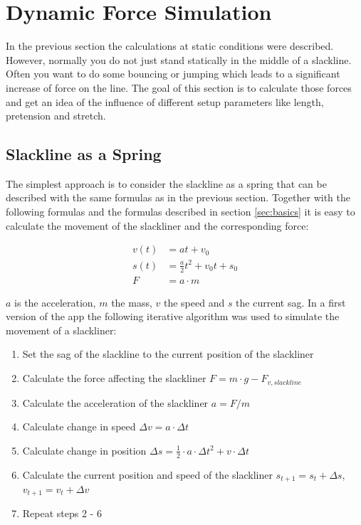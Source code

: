 \chapter{Dynamic Force Simulation}

In the previous section the calculations at static conditions were described. However, normally you do not just stand statically in the middle of a slackline. Often you want to do some bouncing or jumping which leads to a significant increase of force on the line. The goal of this section is to calculate those forces and get an idea of the influence of different setup parameters like length, pretension and stretch.

\section{Slackline as a Spring}

The simplest approach is to consider the slackline as a spring that can be described with the same formulas as in the previous section. Together with the following formulas and the formulas described in section \ref{sec:basics} it is easy to calculate the movement of the slackliner and the corresponding force:

\begin{align}
v(t) &= at+v_0 \\
s(t) &= \frac{a}{2}t^2 + v_0 t + s_0 \\
F &= a\cdot m
\end{align}

$a$ is the acceleration, $m$ the mass, $v$ the speed and $s$ the current sag. In a first version of the app the following iterative algorithm was used to simulate the movement of a slackliner: 

\begin{enumerate}
	\item Set the sag of the slackline to the current position of  the slackliner
	\item Calculate the force affecting the slackliner $F = m\cdot g - F_{v,slackline}$
	\item Calculate the acceleration of the slackliner $a = F / m$
	\item Calculate change in speed $\Delta v = a\cdot\Delta t$
	\item Calculate change in position $\Delta s = \frac{1}{2}\cdot a\cdot\Delta t^2 + v\cdot\Delta t$
	\item Calculate the current position and speed of the slackliner $s_{t+1} = s_{t} + \Delta s$, $v_{t+1} = v_{t} + \Delta v$
	\item Repeat steps 2 - 6
\end{enumerate}

